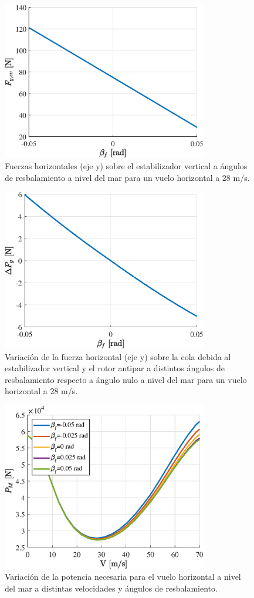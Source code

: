 \begin{figure}
	\centering
	\includegraphics[width=90mm]{graficos/FEVb}
	\caption{Fuerzas horizontales (eje y) sobre el estabilizador vertical a ángulos de resbalamiento a nivel del mar para un vuelo horizontal a 28 m/s.}
	\label{FEVb}
\end{figure}

\begin{figure}
	\centering
	\includegraphics[width=90mm]{graficos/deltafyb}
	\caption{Variación de la fuerza horizontal (eje y) sobre la cola debida al estabilizador vertical y el rotor antipar a distintos ángulos de resbalamiento respecto a ángulo nulo a nivel del mar para un vuelo horizontal a 28 m/s.}
	\label{deltafyb}
\end{figure}

\begin{figure}
	\centering
	\includegraphics[width=90mm]{graficos/Potb}
	\caption{Variación de la potencia necesaria para el vuelo horizontal a nivel del mar a distintas velocidades y ángulos de resbalamiento.}
	\label{Potb}
\end{figure}

